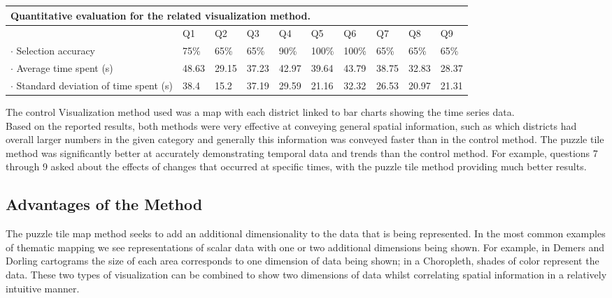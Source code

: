 \documentclass[a4paper,man,natbib]{apa6}
\begin{document}
	\begin{adjustbox}{width=\columnwidth,center}
		\begin{tabular}{l l l l l l l l l l}
			\multicolumn{10}{l}{Quantitative evaluation for the related visualization method.} \\
			\hline
			    & Q1 & Q2 & Q3 & Q4 & Q5 & Q6 & Q7 & Q8 & Q9 \\
			\hline
			$\cdot$ Selection accuracy & 75\% & 65\% & 65\% & 90\% & 100\% & 100\% & 65\% & 65\% & 65\% \\
			$\cdot$ Average time spent (s) & 48.63 & 29.15 & 37.23 & 42.97 & 39.64  & 43.79 & 38.75 & 32.83 & 28.37 \\
			$\cdot$ Standard deviation of time spent (s) & 38.4 & 15.2 & 37.19 & 29.59 & 21.16 & 32.32 & 26.53 & 20.97 & 21.31 \\
			\hline
		\end{tabular}	
	\end{adjustbox} \vspace{1em}

	The control Visualization method used was a map with each district linked to bar charts showing the time series data. \\
	
	Based on the reported results, both methods were very effective at conveying general spatial information, such as which districts had overall larger numbers in the given category and generally this information was conveyed faster than in the control method. The puzzle tile method was significantly better at accurately demonstrating temporal data and trends than the control method. For example, questions 7 through 9 asked about the effects of changes that occurred at specific times, with the puzzle tile method providing much better results. \\
	
	\subsection{Advantages of the Method}
	The puzzle tile map method seeks to add an additional dimensionality to the data that is being represented. In the most common examples of thematic mapping we see representations of scalar data with one or two additional dimensions being shown. For example, in Demers and Dorling cartograms the size of each area corresponds to one dimension of data being shown; in a Choropleth, shades of color represent the data. These two types of visualization can be combined to show two dimensions of data whilst correlating spatial information in a relatively intuitive manner. \\
	
\end{document}

